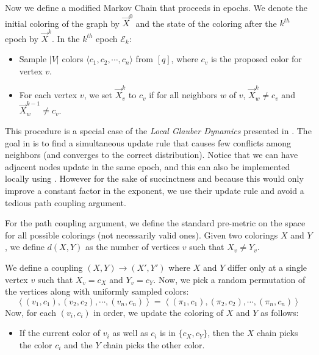 Now we define a modified Markov Chain that proceeds in epochs.
We denote the initial coloring of the graph by $\vec X^0$ and the state of the coloring after the $k^{th}$ epoch by $\vec X^k$.
In the $k^{th}$ epoch $\mathcal E_k$:
\begin{itemize}
    \item Sample $|V|$ colors $ \langle c_1, c_2,\cdots, c_n \rangle$ from $[q]$, where $c_v$ is the proposed color for vertex $v$.
    \item For each vertex $v$, we set $\vec X^k_v$ to $c_v$ if for all neighbors $w$ of $v$, $\vec X^k_w\not=c_v$ and $\vec X^{k-1}_w\not=c_v$.
\end{itemize}

This procedure is a special case of the \emph{Local Glauber Dynamics} presented in \cite{mohsen}.
The goal in \cite{mohsen} is to find a simultaneous update rule that causes few conflicts among neighbors (and converges to the correct distribution).
Notice that we can have adjacent nodes update in the same epoch, and this can also be implemented locally using .
However for the sake of succinctness and because this would only improve a constant factor in the exponent,
we use their update rule and avoid a tedious path coupling argument.

For the path coupling argument, we define the standard pre-metric on the space for all possible colorings (not necessarily valid ones).
Given two colorings $X$ and $Y$, we define $d(X,Y)$ as the number of vertices $v$ such that $X_v\not= Y_v$.

We define a coupling $(X,Y)\rightarrow(X',Y')$ where $X$ and $Y$ differ only at a single vertex $v$ such that $X_v = c_X$ and $Y_v = c_Y$.
Now, we pick a random permutation of the vertices along with uniformly sampled colors:
\[
\left\langle (v_1, c_1), (v_2, c_2), \cdots, (v_n, c_n)\right\rangle
= \left\langle (\pi_1, c_1), (\pi_2, c_2), \cdots, (\pi_n, c_n)\right\rangle
\]
Now, for each $(v_i, c_i)$ in order, we update the coloring of $X$ and $Y$ as follows:
\begin{itemize}
    \item If the current color of $v_i$ as well as $c_i$ is in $\{c_X,c_Y\}$,
    then the $X$ chain picks the color $c_i$ and the $Y$ chain picks the other color.
\end{itemize}


